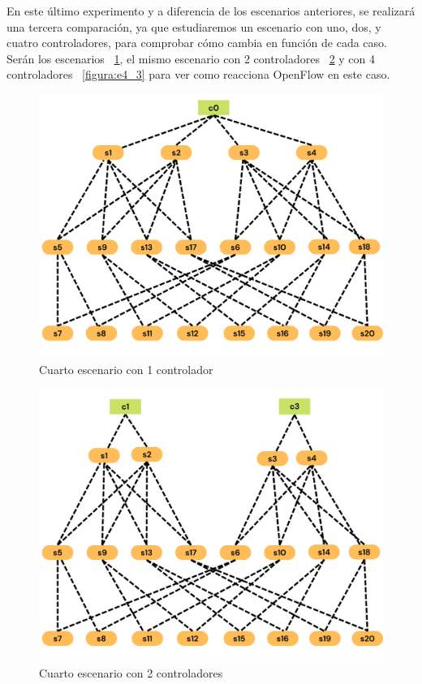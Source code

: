 \documentclass[a4paper, 12pt]{book}
\begin{document}
	En este último experimento y a diferencia de los escenarios anteriores, se realizará una tercera comparación, ya que estudiaremos un escenario con uno, dos, y cuatro controladores, para comprobar cómo cambia en función de cada caso.
	Serán los escenarios ~\ref{figura:e4_1}, el mismo escenario con 2 controladores ~\ref{figura:e4_2} y con 4 controladores ~\ref{figura:e4_3} para ver como reacciona OpenFlow en este caso.
	
	\begin{figure}[H]
		\centering
		\includegraphics[width=16cm, keepaspectratio]{img/e4_1}
		\caption{Cuarto escenario con 1 controlador}
		\label{figura:e4_1}
	\end{figure}
	
	\begin{figure}[H]
		\centering
		\includegraphics[width=16cm, keepaspectratio]{img/e4_2}
		\caption{Cuarto escenario con 2 controladores}
		\label{figura:e4_2}
	\end{figure}
	
\end{document}
